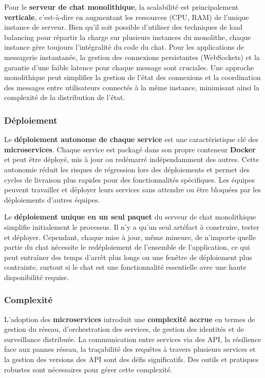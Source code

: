 \documentclass[12pt]{rapportPfe}
\begin{document}
Pour le \textbf{serveur de chat monolithique}, la scalabilité est principalement \textbf{verticale}, c'est-à-dire en augmentant les ressources (CPU, RAM) de l'unique instance de serveur. Bien qu'il soit possible d'utiliser des techniques de load balancing pour répartir la charge sur plusieurs instances du monolithe, chaque instance gère toujours l'intégralité du code du chat. Pour les applications de messagerie instantanée, la gestion des connexions persistantes (WebSockets) et la garantie d'une faible latence pour chaque message sont cruciales. Une approche monolithique peut simplifier la gestion de l'état des connexions et la coordination des messages entre utilisateurs connectés à la même instance, minimisant ainsi la complexité de la distribution de l'état.

\subsubsection{Déploiement}

Le \textbf{déploiement autonome de chaque service} est une caractéristique clé des \textbf{microservices}. Chaque service est packagé dans son propre conteneur \textbf{Docker} et peut être déployé, mis à jour ou redémarré indépendamment des autres. Cette autonomie réduit les risques de régression lors des déploiements et permet des cycles de livraison plus rapides pour des fonctionnalités spécifiques. Les équipes peuvent travailler et déployer leurs services sans attendre ou être bloquées par les déploiements d'autres équipes.

Le \textbf{déploiement unique en un seul paquet} du serveur de chat monolithique simplifie initialement le processus. Il n'y a qu'un seul artéfact à construire, tester et déployer. Cependant, chaque mise à jour, même mineure, de n'importe quelle partie du chat nécessite le redéploiement de l'ensemble de l'application, ce qui peut entraîner des temps d'arrêt plus longs ou une fenêtre de déploiement plus contrainte, surtout si le chat est une fonctionnalité essentielle avec une haute disponibilité requise.

\subsubsection{Complexité}

L'adoption des \textbf{microservices} introduit une \textbf{complexité accrue} en termes de gestion du réseau, d'orchestration des services, de gestion des identités et de surveillance distribuée. La communication entre services via des API, la résilience face aux pannes réseau, la traçabilité des requêtes à travers plusieurs services et la gestion des versions des API sont des défis significatifs. Des outils et pratiques robustes sont nécessaires pour gérer cette complexité.
\end{document}
